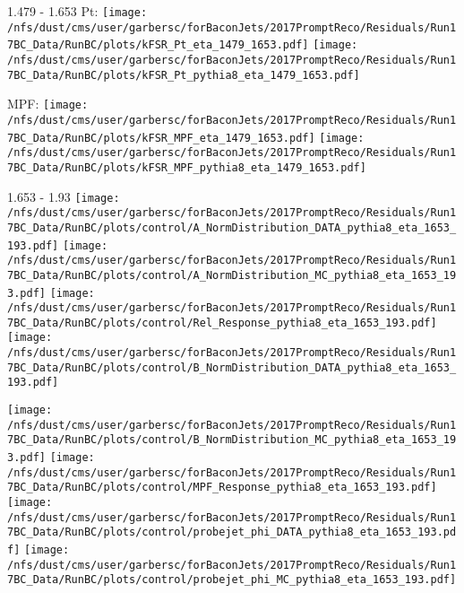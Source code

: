 \documentclass[t,compress]{beamer}
\begin{document}
\begin{frame}{1.479 - 1.653}
	 Pt: \texttt{[image: /nfs/dust/cms/user/garbersc/forBaconJets/2017PromptReco/Residuals/Run17BC\_Data/RunBC/plots/kFSR\_Pt\_eta\_1479\_1653.pdf]}
	\texttt{[image: /nfs/dust/cms/user/garbersc/forBaconJets/2017PromptReco/Residuals/Run17BC\_Data/RunBC/plots/kFSR\_Pt\_pythia8\_eta\_1479\_1653.pdf]}
\newline

	 MPF: \texttt{[image: /nfs/dust/cms/user/garbersc/forBaconJets/2017PromptReco/Residuals/Run17BC\_Data/RunBC/plots/kFSR\_MPF\_eta\_1479\_1653.pdf]}
	\texttt{[image: /nfs/dust/cms/user/garbersc/forBaconJets/2017PromptReco/Residuals/Run17BC\_Data/RunBC/plots/kFSR\_MPF\_pythia8\_eta\_1479\_1653.pdf]}
\end{frame}

\begin{frame}{1.653 - 1.93}
	\texttt{[image: /nfs/dust/cms/user/garbersc/forBaconJets/2017PromptReco/Residuals/Run17BC\_Data/RunBC/plots/control/A\_NormDistribution\_DATA\_pythia8\_eta\_1653\_193.pdf]}
	\texttt{[image: /nfs/dust/cms/user/garbersc/forBaconJets/2017PromptReco/Residuals/Run17BC\_Data/RunBC/plots/control/A\_NormDistribution\_MC\_pythia8\_eta\_1653\_193.pdf]}
	\texttt{[image: /nfs/dust/cms/user/garbersc/forBaconJets/2017PromptReco/Residuals/Run17BC\_Data/RunBC/plots/control/Rel\_Response\_pythia8\_eta\_1653\_193.pdf]}
	\texttt{[image: /nfs/dust/cms/user/garbersc/forBaconJets/2017PromptReco/Residuals/Run17BC\_Data/RunBC/plots/control/B\_NormDistribution\_DATA\_pythia8\_eta\_1653\_193.pdf]}
\newline

	\texttt{[image: /nfs/dust/cms/user/garbersc/forBaconJets/2017PromptReco/Residuals/Run17BC\_Data/RunBC/plots/control/B\_NormDistribution\_MC\_pythia8\_eta\_1653\_193.pdf]}
	\texttt{[image: /nfs/dust/cms/user/garbersc/forBaconJets/2017PromptReco/Residuals/Run17BC\_Data/RunBC/plots/control/MPF\_Response\_pythia8\_eta\_1653\_193.pdf]}
	\texttt{[image: /nfs/dust/cms/user/garbersc/forBaconJets/2017PromptReco/Residuals/Run17BC\_Data/RunBC/plots/control/probejet\_phi\_DATA\_pythia8\_eta\_1653\_193.pdf]}
	\texttt{[image: /nfs/dust/cms/user/garbersc/forBaconJets/2017PromptReco/Residuals/Run17BC\_Data/RunBC/plots/control/probejet\_phi\_MC\_pythia8\_eta\_1653\_193.pdf]}
\end{frame}
\end{document}
